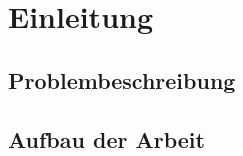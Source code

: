 %
%
%

\chapter{Einleitung}\label{chp:Einleitung}
\section{Problembeschreibung}\label{sct:Problembeschreibung}
\section{Aufbau der Arbeit}\label{sct:Aufbau der Arbeit}

%
%
%